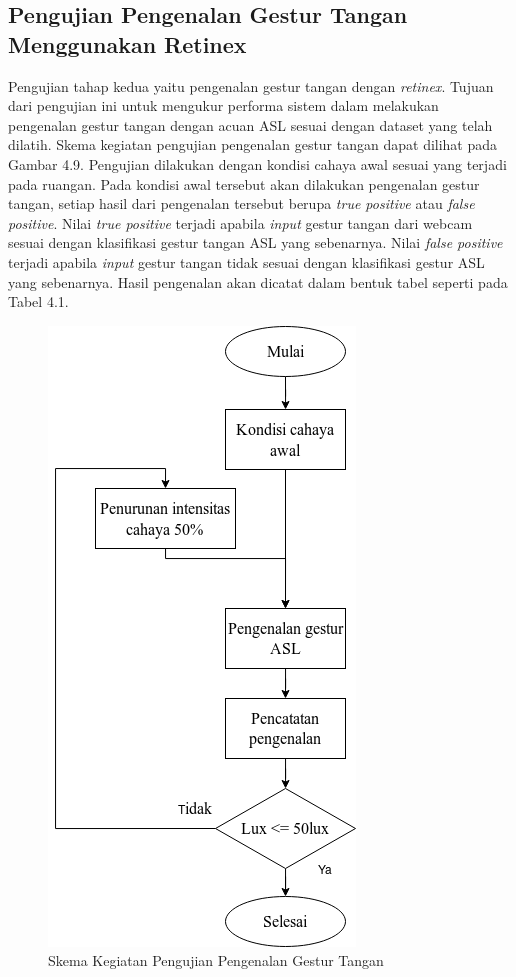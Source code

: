 \subsection{Pengujian Pengenalan Gestur Tangan Menggunakan Retinex}
Pengujian tahap kedua yaitu pengenalan gestur tangan dengan \emph{retinex}. Tujuan dari pengujian ini untuk mengukur performa sistem dalam melakukan pengenalan gestur tangan dengan acuan ASL sesuai dengan dataset yang telah dilatih. Skema kegiatan pengujian pengenalan gestur tangan dapat dilihat pada Gambar 4.9.
Pengujian dilakukan dengan kondisi cahaya awal sesuai yang terjadi pada ruangan. Pada kondisi awal tersebut akan dilakukan pengenalan gestur tangan, setiap hasil dari pengenalan tersebut berupa \emph{true positive} atau \emph{false positive}. Nilai \emph{true positive} terjadi apabila \emph{input} gestur tangan dari webcam sesuai dengan klasifikasi gestur tangan ASL yang sebenarnya. Nilai \emph{false positive} terjadi apabila \emph{input} gestur tangan tidak sesuai dengan klasifikasi gestur ASL yang sebenarnya. Hasil pengenalan akan dicatat dalam bentuk tabel seperti pada Tabel 4.1.
\begin{figure}[H]
	\centering
	\includegraphics[width=0.4\linewidth]{"skema pengujian pengenalan tangan"}
	\caption{Skema Kegiatan Pengujian Pengenalan Gestur Tangan}
	\label{fig:screenshot-from-2020-03-04-22-24-45}
\end{figure}

